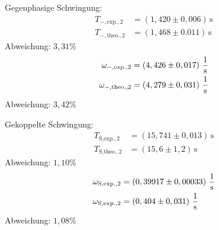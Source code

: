 Gegenphasige Schwingung:\\
\begin{align*}
    T_{-,\text{exp.},2} &= \left(1,420 \pm 0,006\right)\,\unit{\second}\\
    T_{-,\text{theo.},2} &= \left( 1,468 \pm 0.011 \right)\,\unit{\second}
\end{align*}
Abweichung: $3,31\%$
\begin{align*}
    \omega_{-,\text{exp.},2} &= \left(4,426 \pm 0,017 \right)\, \unit[per-mode=fraction]{\per\second}\\
    \omega_{-,\text{theo.},2} &= \left( 4,279 \pm 0,031 \right)\, \unit[per-mode=fraction]{\per\second}
\end{align*}
Abweichung: $3,42\%$

Gekoppelte Schwingung:\\
\begin{align*}
    T_{\text{S,exp.},2} &= \left( 15,741 \pm 0,013 \right)\,\unit{\second}\\
    T_{\text{S,theo.},2} &= \left( 15,6 \pm 1,2 \right)\,\unit{\second}
\end{align*}
Abweichung: $1,10\%$
\begin{align*}
    \omega_{\text{S,exp.},2} &= \left( 0,39917 \pm 0,00033  \right)\, \unit[per-mode=fraction]{\per\second}\\
    \omega_{\text{S,exp.},2} &= \left( 0,404 \pm 0,031  \right)\, \unit[per-mode=fraction]{\per\second}
\end{align*}
Abweichung: $1,08\%$

